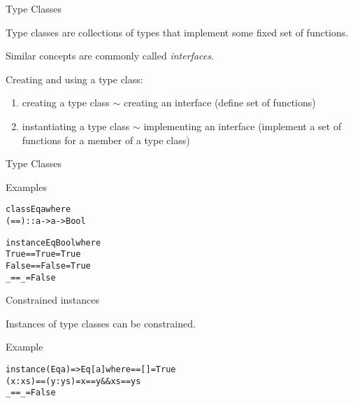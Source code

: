 \documentclass{beamer}
\begin{document}
\begin{frame}{Type Classes}

\begin{block}{\centering Type classes are collections of types that implement some fixed set of functions.}
\end{block}

\pause

Similar concepts are commonly called \textit{interfaces}.

\pause

\vspace{1cm}
Creating and using a type class:\pause
\begin{enumerate}
    \item creating a type class $\sim$ creating an interface (define set of functions)\pause
    \item instantiating a type class $\sim$ implementing an interface (implement a set of functions for a member of a type class)
\end{enumerate}

\end{frame}

\begin{frame}[fragile]{Type Classes}

\begin{exampleblock}{Examples}
\begin{alltt}
class Eq a where\pause
  (==) :: a -> a -> Bool\pause

instance Eq Bool where\pause
  True  == True  = True\pause
  False == False = True\pause
  _     == _     = False
\end{alltt}
\end{exampleblock}

\end{frame}

\begin{frame}[fragile]{Constrained instances}

Instances of type classes can be constrained.

\pause

\begin{exampleblock}{Example}
\begin{alltt}
instance (Eq a) => Eq [a] where\pause
  [] == [] = True\pause
  (x:xs) == (y:ys) = x == y && xs == ys\pause
  _ == _ = False
\end{alltt}
\end{exampleblock}

\end{frame}
\end{document}
